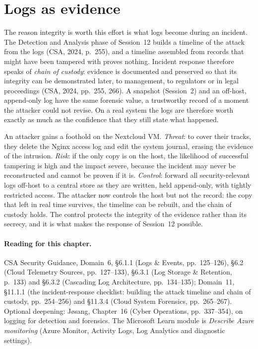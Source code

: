\section{Logs as evidence}

The reason integrity is worth this effort is what logs become during an
incident. The Detection and Analysis phase of Session~12 builds a timeline of
the attack from the logs (CSA, 2024, p.~255), and a timeline assembled from
records that might have been tampered with proves nothing. Incident response
therefore speaks of \emph{chain of custody}: evidence is documented and
preserved so that its integrity can be demonstrated later, to management, to
regulators or in legal proceedings (CSA, 2024, pp.~255, 266). A snapshot
(Session~2) and an off-host, append-only log have the same forensic value, a
trustworthy record of a moment the attacker could not revise. On a real
system the logs are therefore worth exactly as much as the confidence that
they still state what happened.

\begin{example}\label{ex:logship-trc}
An attacker gains a foothold on the Nextcloud VM. \emph{Threat}: to cover
their tracks, they delete the Nginx access log and edit the system journal,
erasing the evidence of the intrusion. \emph{Risk}: if the only copy is on the
host, the likelihood of successful tampering is high and the impact severe,
because the incident may never be reconstructed and cannot be proven if it
is. \emph{Control}: forward all security-relevant logs off-host to a central
store as they are written, held append-only, with tightly restricted access.
The attacker now controls the host but not the record: the copy that left in
real time survives, the timeline can be rebuilt, and the chain of custody
holds. The control protects the integrity of the evidence rather than its
secrecy, and it is what makes the response of Session~12 possible.
\end{example}

\paragraph{Reading for this chapter.} CSA Security Guidance, Domain~6,
\S6.1.1 (Logs \& Events, pp.~125--126), \S6.2 (Cloud Telemetry Sources,
pp.~127--133), \S6.3.1 (Log Storage \& Retention, p.~133) and \S6.3.2
(Cascading Log Architecture, pp.~134--135); Domain~11, \S11.1.1 (the
incident-response checklist: building the attack timeline and chain of
custody, pp.~254--256) and \S11.3.4 (Cloud System Forensics, pp.~265--267).
Optional deepening: J\o sang, Chapter~16 (Cyber Operations, pp.~337--354), on logging for
detection and forensics. The Microsoft Learn module is \emph{Describe Azure
monitoring} (Azure Monitor, Activity Logs, Log Analytics and diagnostic
settings).

